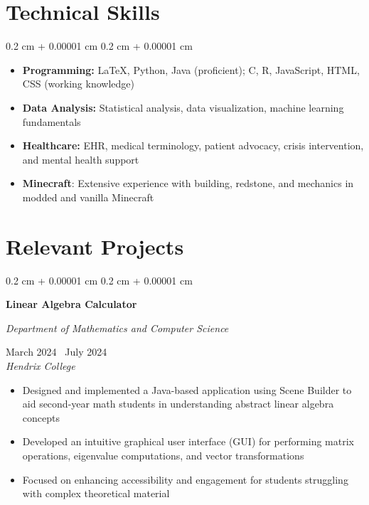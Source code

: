 \documentclass[10pt, letterpaper]{article}
\newenvironment{highlights}{
    \begin{itemize}[
        topsep=0.10 cm,
        parsep=0.10 cm,
        partopsep=0pt,
        itemsep=0pt,
        leftmargin=0.4 cm + 10pt
    ]
}{
    \end{itemize}
} %
\newenvironment{onecolentry}{
    \begin{adjustwidth}{
        0.2 cm + 0.00001 cm
    }{
        0.2 cm + 0.00001 cm
    }
}{
    \end{adjustwidth}
} %
\newenvironment{twocolentry}[2][]{
    \onecolentry
    \def\secondColumn{#2}
    \setcolumnwidth{\fill, 4.5 cm}
    \begin{paracol}{2}
}{
    \switchcolumn \raggedleft \secondColumn
    \end{paracol}
    \endonecolentry
} %
\begin{document}


\section{Technical Skills}

\begin{onecolentry}
    \begin{highlights}
        \item \textbf{Programming:} \LaTeX, Python, Java (proficient); C, R, JavaScript, HTML, CSS (working knowledge)
        \item \textbf{Data Analysis:} Statistical analysis, data visualization, machine learning fundamentals
        \item \textbf{Healthcare:} EHR, medical terminology, patient advocacy, crisis intervention, and mental health support
        \item \textbf{Minecraft}: Extensive experience with building, redstone, and mechanics in modded and vanilla Minecraft  
    \end{highlights}
\end{onecolentry}

\section{Relevant Projects}

\begin{twocolentry}
    {
        March 2024 \textendash\ July 2024 \\

        \textit{Hendrix College}
    }
    \textbf{Linear Algebra Calculator}

    \textit{Department of Mathematics and Computer Science}

\end{twocolentry}

\vspace{0.1cm}
\begin{highlights}
    \item Designed and implemented a Java-based application using Scene Builder to aid second-year math students in understanding abstract linear algebra concepts
    \item Developed an intuitive graphical user interface (GUI) for performing matrix operations, eigenvalue computations, and vector transformations
    \item Focused on enhancing accessibility and engagement for students struggling with complex theoretical material
\end{highlights}
\end{document}
